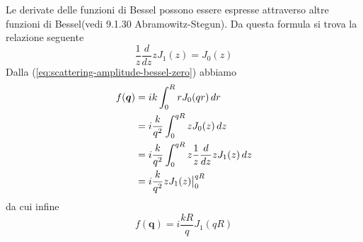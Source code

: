 Le derivate delle funzioni di Bessel possono essere espresse attraverso altre funzioni di Bessel(vedi 9.1.30
Abramowitz-Stegun\cite{AbramSteg}).
Da questa formula si trova la relazione seguente
\[
 \frac{1}{z} \frac{d}{dz} z J_1(z) = J_0(z)
\]
Dalla (\ref{eq:scattering-amplitude-bessel-zero}) abbiamo
\begin{align*}
    f(\bm{q}) & = ik \int_{0}^R rJ_{0}(qr) \, dr \\
    &= i \frac{k}{q^{2}}\int_{0}^{qR}zJ_{0}(z) \, dz \\
    & = i \frac{k}{q^{2}}\int_{0}^{qR}z \frac{1}{z} \frac{d}{dz}zJ_{1}(z) \, dz \\
    & = i \frac{k}{q^{2}} zJ_{1}(z) \big{|}_{0}^{qR}
\end{align*}
da cui infine
\[
f(\bm{q}) = i \frac{kR}{q}J_{1}(qR)
\]